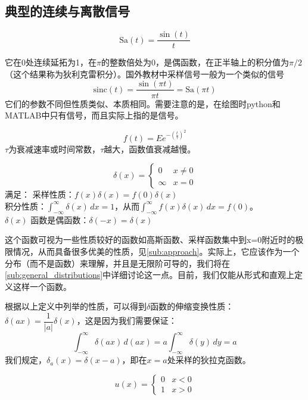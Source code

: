 \begin{definition}
\subsection{典型的连续与离散信号}\label{sub:ordinary_signal}
\begin{definition}[采样信号]
    \[\text{Sa}(t)=\frac{\sin(t)}{t}\]
\end{definition}
它在0处连续延拓为1，在$\pi$的整数倍处为0，是偶函数，在正半轴上的积分值为$\pi /2$（这个结果称为狄利克雷积分）。国外教材中采样信号一般为一个类似的信号
\[\text{sinc}(t)=\frac{\sin(\pi t)}{\pi t}=\text{Sa}(\pi t)\]
它们的参数不同但性质类似、本质相同。需要注意的是，在绘图时python和MATLAB中只有信号，而且实际上指的是信号。
\begin{definition}
    \[f(t)=Ee^{-{\left(\frac{t}{\tau }\right)}^2}\]
    $\tau$为衰减速率或时间常数，$\tau$越大，函数值衰减越慢。
\end{definition}
\begin{definition}
    $$\delta (x)=\begin{cases}
        0      & x\neq 0 \\
        \infty & x=0
    \end{cases}$$满足： 采样性质：$f(x)\delta (x)=f(0)\delta (x)$\\
 积分性质：$\int_{-\infty}^{\infty}\delta (x)\,dx=1$，从而$\int_{-\infty}^{\infty}f(x)\delta (x)\,dx=f(0)$。\\
 $\delta(x)$ 函数是偶函数：$\delta (-x)=\delta (x)$
\end{definition}
这个函数可视为一些性质较好的函数如高斯函数、采样函数集中到x=0附近时的极限情况，从而具备很多优美的性质，见\ref{sub:approach}。实际上，它应该作为一个分布（而不是函数）来理解，并且是无限阶可导的，我们将在\ref{sub:general_distributions}中详细讨论这一点。目前，我们仅能从形式和直观上定义这样一个函数。

根据以上定义中列举的性质，可以得到$\delta$函数的伸缩变换性质：$\delta(ax)=\dfrac{1}{|a|}\delta(x)$，这是因为我们需要保证：
\[\int_{-\infty}^{\infty}\delta(ax)\,d(ax)=a\int_{-\infty}^{\infty}\delta(y)\,dy=a\]
我们规定，$\delta_a(x)=\delta (x-a)$，即在$x=a$处采样的狄拉克函数。

\begin{definition}[单位阶跃函数]
    \[u(x)=
    \begin{cases}
        0 & x<0 \\
        1 & x>0
    \end{cases}\]
\end{definition}


\end{definition}
